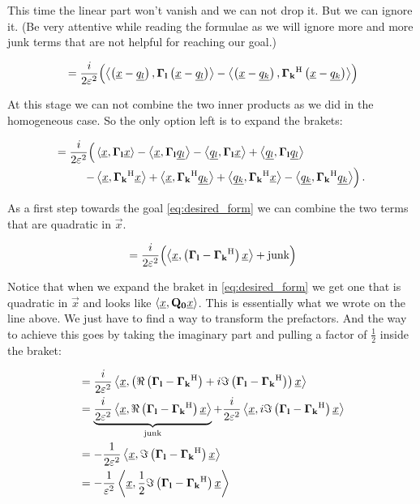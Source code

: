 This time the linear part won't vanish and we can not drop it. But we can ignore it.
(Be very attentive while reading the formulae as we will ignore more and more junk
terms that are not helpful for reaching our goal.)

\begin{align*}
  & = \frac{i}{2\varepsilon^2} \Bigl(
    \left\langle \left( \underline{x}-\underline{q_l} \right) , \mathbf{\Gamma_l} \left( \underline{x}-\underline{q_l} \right) \right\rangle - \left\langle \left( \underline{x}-\underline{q_k} \right) , \mathbf{\Gamma_k}{}^{\textnormal{H}} \left( \underline{x}-\underline{q_k} \right) \right\rangle
    \Bigr) \\
\end{align*}

At this stage we can not combine the two inner products as we did in the homogeneous
case. So the only option left is to expand the brakets:

\begin{align*}
  = \frac{i}{2\varepsilon^2} \Bigl(
    &
      \left\langle \underline{x} , \mathbf{\Gamma_l} \underline{x} \right\rangle
      - \left\langle \underline{x} , \mathbf{\Gamma_l} \underline{q_l} \right\rangle
      - \left\langle \underline{q_l} , \mathbf{\Gamma_l} \underline{x} \right\rangle
      + \left\langle \underline{q_l} , \mathbf{\Gamma_l} \underline{q_l} \right\rangle \\
    - & \left\langle \underline{x} , \mathbf{\Gamma_k}{}^{\textnormal{H}} \underline{x} \right\rangle
      + \left\langle \underline{x} , \mathbf{\Gamma_k}{}^{\textnormal{H}} \underline{q_k} \right\rangle
      + \left\langle \underline{q_k} , \mathbf{\Gamma_k}{}^{\textnormal{H}} \underline{x} \right\rangle
      - \left\langle \underline{q_k} , \mathbf{\Gamma_k}{}^{\textnormal{H}} \underline{q_k} \right\rangle
    \Bigr) \,.
\end{align*}

As a first step towards the goal \eqref{eq:desired_form} we can combine the two terms that are quadratic
in $\vec{x}$.

\begin{align*}
  & = \frac{i}{2\varepsilon^2} \Bigl( \left\langle \underline{x} , \left( \mathbf{\Gamma_l} - \mathbf{\Gamma_k}{}^{\textnormal{H}} \right) \underline{x} \right\rangle + \text{junk} \Bigr) \\
\end{align*}

Notice that when we expand the braket in \eqref{eq:desired_form} we get one
that is quadratic in $\vec{x}$ and looks like $\left\langle \underline{x} , \mathbf{Q_0} \underline{x} \right\rangle$. This is essentially
what we wrote on the line above. We just have to find a way to transform the
prefactors. And the way to achieve this goes by taking the imaginary part and
pulling a factor of $\frac{1}{2}$ inside the braket:

\begin{align*}
  & = \frac{i}{2\varepsilon^2} \left\langle \underline{x} , \left( \Re\left( \mathbf{\Gamma_l} - \mathbf{\Gamma_k}{}^{\textnormal{H}} \right)+i\Im\left( \mathbf{\Gamma_l} - \mathbf{\Gamma_k}{}^{\textnormal{H}} \right) \right) \underline{x} \right\rangle \\
  & = \underbrace{\frac{i}{2\varepsilon^2} \left\langle \underline{x} , \Re\left( \mathbf{\Gamma_l} - \mathbf{\Gamma_k}{}^{\textnormal{H}} \right) \underline{x} \right\rangle}_{\text{junk}}
    + \frac{i}{2\varepsilon^2} \left\langle \underline{x} , i\Im\left( \mathbf{\Gamma_l} - \mathbf{\Gamma_k}{}^{\textnormal{H}} \right) \underline{x} \right\rangle \\
  & = -\frac{1}{2\varepsilon^2} \left\langle \underline{x} , \Im\left( \mathbf{\Gamma_l} - \mathbf{\Gamma_k}{}^{\textnormal{H}} \right) \underline{x} \right\rangle \\
  & = -\frac{1}{\varepsilon^2} \left\langle \underline{x} , \frac{1}{2}\Im\left( \mathbf{\Gamma_l} - \mathbf{\Gamma_k}{}^{\textnormal{H}} \right) \underline{x} \right\rangle
\end{align*}

